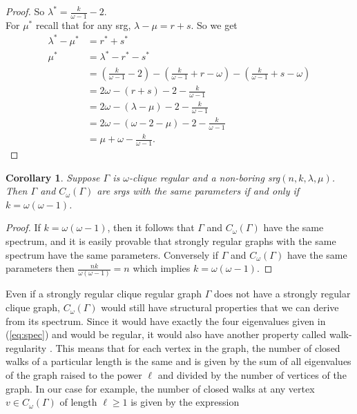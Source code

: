 \documentclass[12pt]{report}
\newtheorem{cor}[thm]{Corollary}
\theoremstyle{definition}
\begin{document}
\begin{proof}
    So $\lambda^* = \frac{k}{\omega -1} -2$.\\
    For $\mu^*$ recall that for any srg, $\lambda - \mu = r+s$. So we get
    \begin{align*}
        \lambda^* - \mu^* &= r^*+s^* \\
        \mu^* &= \lambda^* -r^*-s^* \\
        &= \left(\frac{k}{\omega-1}-2\right)-\left(\frac{k}{\omega -1} +r -\omega\right) -\left(\frac{k}{\omega -1} +s -\omega\right) \\
        &= 2\omega - (r+s)-2-\frac{k}{\omega-1} \\
        &= 2\omega - (\lambda - \mu)-2-\frac{k}{\omega-1}\textbf{}\\
        &= 2\omega - (\omega-2 - \mu)-2-\frac{k}{\omega-1}\\
        &= \mu +\omega- \frac{k}{\omega-1}.
    \end{align*}
\end{proof}
\clearpage
\begin{cor} \label{cor:kww}
    Suppose $\Gamma$ is $\omega$-clique regular and a non-boring \textnormal{srg}$(n,k,\lambda, \mu)$. Then $\Gamma$ and $C_\omega(\Gamma)$ are srgs with the same parameters if and only if $k=\omega(\omega-1)$.
\end{cor}
\begin{proof}
    If $k=\omega(\omega-1)$, then it follows that $\Gamma$ and $C_\omega(\Gamma)$ have the same spectrum, and it is easily provable that strongly regular graphs with the same spectrum have the same parameters. Conversely if $\Gamma$ and $C_\omega(\Gamma)$ have the same parameters then $\frac{nk}{\omega(\omega -1)}=n$ which implies $k=\omega(\omega -1)$.
\end{proof}\par
Even if a strongly regular clique regular graph $\Gamma$ does not have a strongly regular clique graph, $C_\omega(\Gamma)$ would still have structural properties that we can derive from its spectrum. Since it would have exactly the four eigenvalues given in (\ref{eq:spec}) and would be regular, it would also have another property called walk-regularity \cite[Corollary 15.1.2]{haemers}. This means that for each vertex in the graph, the number of closed walks of a particular length is the same and is given by the sum of all eigenvalues of the graph raised to the power $\ell$ and divided by the number of vertices of the graph. In our case for example, the number of closed walks at any vertex $v\in C_\omega(\Gamma)$ of length $\ell\geq 1$ is given by the expression
\end{document}
